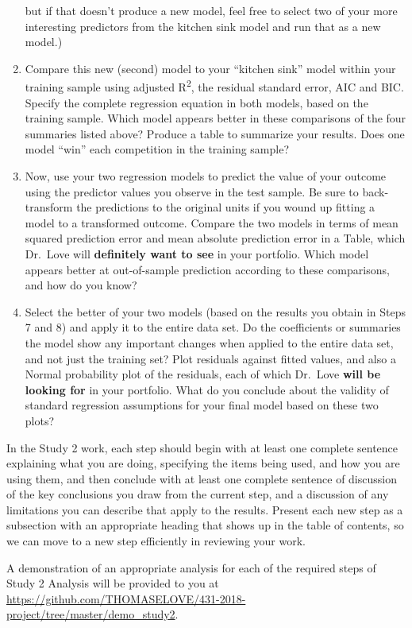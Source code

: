 \documentclass[]{book}
\theoremstyle{definition}
\theoremstyle{definition}
\theoremstyle{definition}
\theoremstyle{remark}
\begin{document}
\begin{enumerate}
  but if that doesn't produce a new model, feel free to select two of
  your more interesting predictors from the kitchen sink model and run
  that as a new model.)
\item
  Compare this new (second) model to your ``kitchen sink'' model within
  your training sample using adjusted R\textsuperscript{2}, the residual
  standard error, AIC and BIC. Specify the complete regression equation
  in both models, based on the training sample. Which model appears
  better in these comparisons of the four summaries listed above?
  Produce a table to summarize your results. Does one model ``win'' each
  competition in the training sample?
\item
  Now, use your two regression models to predict the value of your
  outcome using the predictor values you observe in the test sample. Be
  sure to back-transform the predictions to the original units if you
  wound up fitting a model to a transformed outcome. Compare the two
  models in terms of mean squared prediction error and mean absolute
  prediction error in a Table, which Dr.~Love will \textbf{definitely
  want to see} in your portfolio. Which model appears better at
  out-of-sample prediction according to these comparisons, and how do
  you know?
\item
  Select the better of your two models (based on the results you obtain
  in Steps 7 and 8) and apply it to the entire data set. Do the
  coefficients or summaries the model show any important changes when
  applied to the entire data set, and not just the training set? Plot
  residuals against fitted values, and also a Normal probability plot of
  the residuals, each of which Dr.~Love \textbf{will be looking for} in
  your portfolio. What do you conclude about the validity of standard
  regression assumptions for your final model based on these two plots?
\end{enumerate}

In the Study 2 work, each step should begin with at least one complete
sentence explaining what you are doing, specifying the items being used,
and how you are using them, and then conclude with at least one complete
sentence of discussion of the key conclusions you draw from the current
step, and a discussion of any limitations you can describe that apply to
the results. Present each new step as a subsection with an appropriate
heading that shows up in the table of contents, so we can move to a new
step efficiently in reviewing your work.

A demonstration of an appropriate analysis for each of the required
steps of Study 2 Analysis will be provided to you at
\url{https://github.com/THOMASELOVE/431-2018-project/tree/master/demo_study2}.
\end{document}
